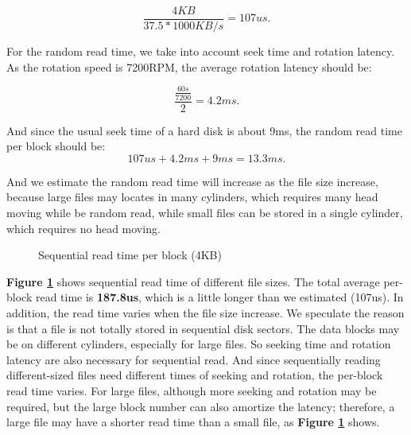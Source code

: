 $$\frac{4KB}{37.5*1000KB/s} = 107us.$$

For the random read time, we take into account seek time and rotation latency. As the rotation speed is 7200RPM, the average rotation latency should be:

$$ \frac{\frac{60s}{7200}}{2} = 4.2ms.$$

And since the usual seek time of a hard disk is about 9ms, the random read time per block should be:
$$ 107us + 4.2ms + 9ms = 13.3ms. $$

And we estimate the random read time will increase as the file size increase, because large files may locates in many cylinders, which requires many head moving while be random read, while small files can be stored in a single cylinder, which requires no head moving.

\begin{figure}[ht]
    \centering
    \caption{Sequential read time per block (4KB)}
    \label{seq_read_time}
\end{figure}

\textbf{Figure \ref{seq_read_time}} shows sequential read time of different file sizes. The total average per-block read time is \textbf{187.8us}, which is a little longer than we estimated (107us). In addition, the read time varies when the file size increase. We speculate the reason is that a file is not totally stored in sequential disk sectors. The data blocks may be on different cylinders, especially for large files. So seeking time and rotation latency are also necessary for
sequential read. And since sequentially reading different-sized files need different times of seeking and rotation, the per-block read time varies. For large files, although more seeking and rotation may be required, but the large block number can also amortize the latency; therefore, a large file may have a shorter read time than a small file, as \textbf{Figure \ref{seq_read_time}} shows.


